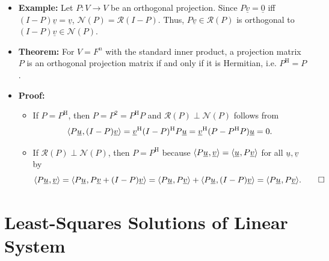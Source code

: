 \documentclass[11pt,twoside]{report}
\newcommand{\vecnot}{\underline}
\newcommand{\Herm}{{\mathrm{H}}}
\newcommand{\tinner}[2]{{\langle #1 \mskip1mu , #2 \rangle}}
\begin{document}
\begin{itemize}
\item \textbf{Example:}
Let $P \colon V \rightarrow V$ be an orthogonal projection.
Since $P\vecnot{v}=\vecnot{0}$ iff $(I-P)\vecnot{v} = \vecnot{v}$, $\mathcal{N}(P) = \mathcal{R}(I-P)$.
Thus, $P \vecnot{v} \in \mathcal{R}(P)$ is orthogonal to $(I-P) \vecnot{v} \in \mathcal{N}(P)$.




\item \textbf{Theorem:} 
For $V=F^n$ with the standard inner product, a projection matrix $P$ is an orthogonal projection matrix if and only if it is Hermitian, i.e. $P^\Herm = P$.



\item \textbf{Proof:} 
\begin{itemize}
\item If $P=P^\Herm$, then $P = P^2 = P^\Herm P$ and $\mathcal{R}(P) \perp \mathcal{N}(P)$ follows from
\[ \tinner{ P\vecnot{u} }{ (I-P)\vecnot{v} } = \vecnot{v}^\Herm (I-P)^\Herm P \vecnot{u} = \vecnot{v}^\Herm (P - P^\Herm P) \vecnot{u} = 0.  \]
\item  If $\mathcal{R}(P) \perp \mathcal{N}(P)$, then $P=P^\Herm$ because  $\tinner{P\vecnot{u}}{\vecnot{v}} = \tinner{\vecnot{u}}{P\vecnot{v}}$ for all $\vecnot{u},\vecnot{v}$ by 
\[ \tinner{P\vecnot{u}}{\vecnot{v}} = \tinner{P\vecnot{u}}{P\vecnot{v}+(I-P)\vecnot{v}} = \tinner{P\vecnot{u}}{P\vecnot{v}} + \tinner{P\vecnot{u}}{(I-P)\vecnot{v}} = \tinner{P \vecnot{u}}{P \vecnot{v}}. \qedhere \]
\end{itemize}



\end{itemize}


\section{Least-Squares Solutions of Linear System}
\end{document}
